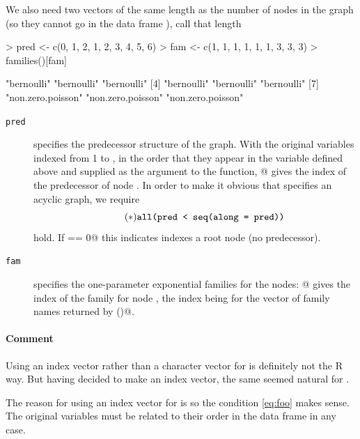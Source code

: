 \documentclass[11pt]{article}
\begin{document}
We also need two vectors of the same length as the number of nodes in the
graph (so they cannot go in the data frame \verb@redata@),
call that length \verb@nnode@
\begin{Schunk}
\begin{Sinput}
> pred <- c(0, 1, 2, 1, 2, 3, 4, 5, 6)
> fam <- c(1, 1, 1, 1, 1, 1, 3, 3, 3)
> families()[fam]
\end{Sinput}
\begin{Soutput}
[1] "bernoulli"        "bernoulli"        "bernoulli"       
[4] "bernoulli"        "bernoulli"        "bernoulli"       
[7] "non.zero.poisson" "non.zero.poisson" "non.zero.poisson"
\end{Soutput}
\end{Schunk}
\begin{description}
\item[\normalfont \texttt{pred}] specifies the predecessor structure of
the graph.  With the original variables indexed from 1 to \verb@nnode@,
in the order that they appear in the variable \verb@vars@ defined above
and supplied as the \verb@varying@ argument to the \verb@reshape@ function,
\verb@pred[j]@ gives the index of the predecessor of node \verb@j@.
In order to make it obvious that \verb@pred@ specifies an acyclic graph,
we require
\begin{equation} \label{eq:foo} \tag{$*$}
\verb@all(pred < seq(along = pred))@
\end{equation}
hold.  If \verb@pred[j] == 0@ this indicates \verb@j@ indexes a root node
(no predecessor).
\item[\normalfont \texttt{fam}] specifies the one-parameter exponential
families for the nodes: \verb@fam[j]@ gives the index of the family for
node \verb@j@, the index being for the vector of family names returned
by \verb@families()@.
\end{description}

\paragraph{Comment}  Using an index vector rather than a character vector
for \verb@fam@ is definitely not the R way.  But having decided
to make \verb@pred@ an index vector, the same seemed natural for \verb@fam@.

The reason for using an index vector for \verb@pred@ is so the condition
\eqref{eq:foo} makes sense.  The original variables must be related to
their order in the data frame \verb@redata@ in any case.
\end{document}
